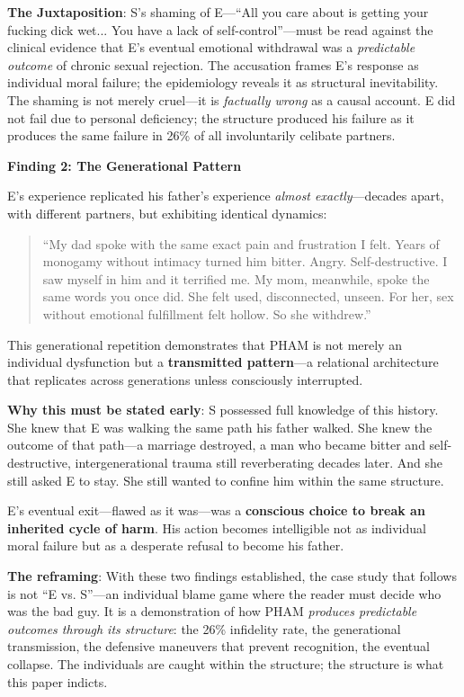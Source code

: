 \documentclass[12pt, letterpaper]{article}
\begin{document}
\textbf{The Juxtaposition}: S's shaming of E---``All you care about is getting your fucking dick wet... You have a lack of self-control''---must be read against the clinical evidence that E's eventual emotional withdrawal was a \textit{predictable outcome} of chronic sexual rejection. The accusation frames E's response as individual moral failure; the epidemiology reveals it as structural inevitability. The shaming is not merely cruel---it is \textit{factually wrong} as a causal account. E did not fail due to personal deficiency; the structure produced his failure as it produces the same failure in 26\% of all involuntarily celibate partners.

\textbf{Finding 2: The Generational Pattern}

E's experience replicated his father's experience \textit{almost exactly}---decades apart, with different partners, but exhibiting identical dynamics:

\begin{quote}
``My dad spoke with the same exact pain and frustration I felt. Years of monogamy without intimacy turned him bitter. Angry. Self-destructive. I saw myself in him and it terrified me. My mom, meanwhile, spoke the same words you once did. She felt used, disconnected, unseen. For her, sex without emotional fulfillment felt hollow. So she withdrew.''
\end{quote}

This generational repetition demonstrates that PHAM is not merely an individual dysfunction but a \textbf{transmitted pattern}---a relational architecture that replicates across generations unless consciously interrupted.

\textbf{Why this must be stated early}: S possessed full knowledge of this history. She knew that E was walking the same path his father walked. She knew the outcome of that path---a marriage destroyed, a man who became bitter and self-destructive, intergenerational trauma still reverberating decades later. And she still asked E to stay. She still wanted to confine him within the same structure.

E's eventual exit---flawed as it was---was a \textbf{conscious choice to break an inherited cycle of harm}. His action becomes intelligible not as individual moral failure but as a desperate refusal to become his father.

\textbf{The reframing}: With these two findings established, the case study that follows is not ``E vs. S''---an individual blame game where the reader must decide who was the bad guy. It is a demonstration of how PHAM \textit{produces predictable outcomes through its structure}: the 26\% infidelity rate, the generational transmission, the defensive maneuvers that prevent recognition, the eventual collapse. The individuals are caught within the structure; the structure is what this paper indicts.
\end{document}

